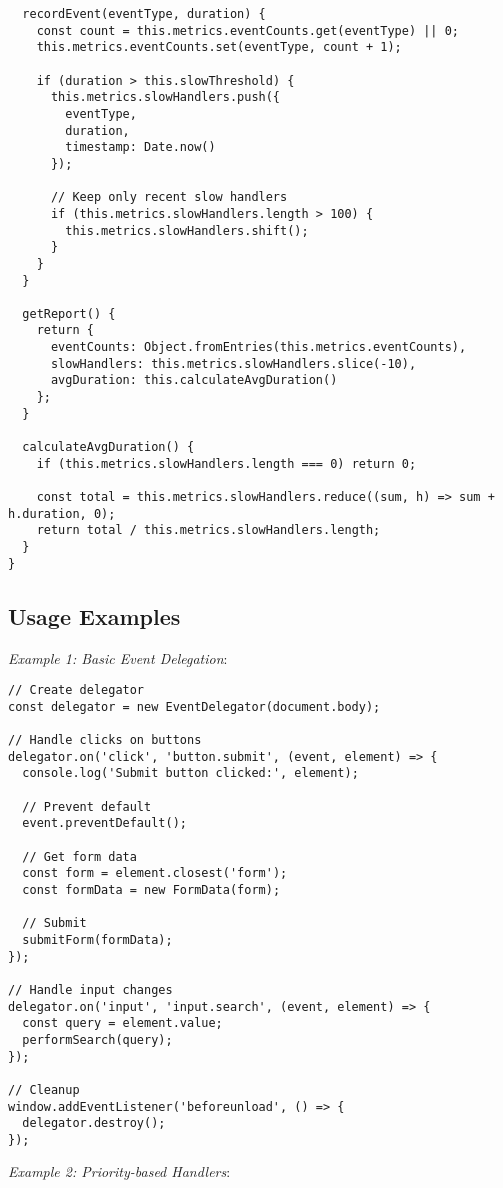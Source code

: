 \documentclass[11pt]{article}
\begin{document}
\begin{verbatim}
  recordEvent(eventType, duration) {
    const count = this.metrics.eventCounts.get(eventType) || 0;
    this.metrics.eventCounts.set(eventType, count + 1);
    
    if (duration > this.slowThreshold) {
      this.metrics.slowHandlers.push({
        eventType,
        duration,
        timestamp: Date.now()
      });
      
      // Keep only recent slow handlers
      if (this.metrics.slowHandlers.length > 100) {
        this.metrics.slowHandlers.shift();
      }
    }
  }
  
  getReport() {
    return {
      eventCounts: Object.fromEntries(this.metrics.eventCounts),
      slowHandlers: this.metrics.slowHandlers.slice(-10),
      avgDuration: this.calculateAvgDuration()
    };
  }
  
  calculateAvgDuration() {
    if (this.metrics.slowHandlers.length === 0) return 0;
    
    const total = this.metrics.slowHandlers.reduce((sum, h) => sum + h.duration, 0);
    return total / this.metrics.slowHandlers.length;
  }
}
\end{verbatim}
\subsection{Usage Examples}
\label{sec:orgc95a9ac}

\emph{Example 1: Basic Event Delegation}:

\begin{verbatim}
// Create delegator
const delegator = new EventDelegator(document.body);

// Handle clicks on buttons
delegator.on('click', 'button.submit', (event, element) => {
  console.log('Submit button clicked:', element);
  
  // Prevent default
  event.preventDefault();
  
  // Get form data
  const form = element.closest('form');
  const formData = new FormData(form);
  
  // Submit
  submitForm(formData);
});

// Handle input changes
delegator.on('input', 'input.search', (event, element) => {
  const query = element.value;
  performSearch(query);
});

// Cleanup
window.addEventListener('beforeunload', () => {
  delegator.destroy();
});
\end{verbatim}

\emph{Example 2: Priority-based Handlers}:
\end{document}
